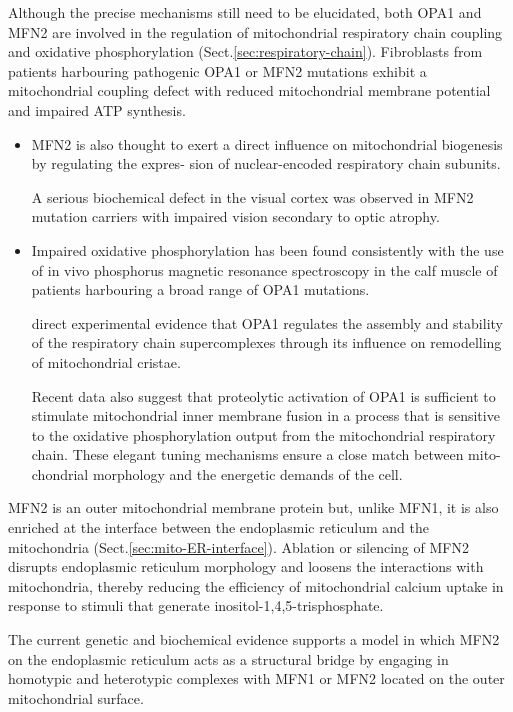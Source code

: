   
  Although the precise mechanisms still need to be elucidated, both OPA1 and
  MFN2 are involved in the regulation of mitochondrial respiratory chain
  coupling and oxidative phosphorylation (Sect.\ref{sec:respiratory-chain}).
  Fibroblasts from patients harbouring pathogenic OPA1 or MFN2 mutations exhibit
  a mitochondrial coupling defect with reduced mitochondrial membrane potential
  and impaired ATP synthesis.
  
  \begin{itemize}
  
    \item MFN2 is also thought to exert a direct influence on mitochondrial
    biogenesis by regulating the expres- sion of nuclear-encoded respiratory
    chain subunits.
    
    A serious biochemical defect in the visual cortex was observed in MFN2
    mutation carriers with impaired vision secondary to optic atrophy.
  
    \item Impaired oxidative phosphorylation has been found consistently with
    the use of in vivo phosphorus magnetic resonance spectroscopy in the calf
    muscle of patients harbouring a broad range of OPA1 mutations.
    
    
    direct experimental evidence that OPA1 regulates the assembly and
    stability of the respiratory chain supercomplexes through its influence on
    remodelling of mitochondrial cristae.
    
    Recent data also suggest that proteolytic activation of OPA1 is sufficient
    to stimulate mitochondrial inner membrane fusion in a process that is
    sensitive to the oxidative phosphorylation output from the mitochondrial
    respiratory chain.
    These elegant tuning mechanisms ensure a close match between mito- chondrial morphology and the energetic demands of the cell.
    
  \end{itemize}
  
  
  MFN2 is an outer mitochondrial membrane protein but, unlike MFN1, it is also
  enriched at the interface between the endoplasmic reticulum and the
  mitochondria (Sect.\ref{sec:mito-ER-interface}).
  Ablation or silencing of MFN2 disrupts endoplasmic reticulum morphology and
  loosens the interactions with mitochondria, thereby reducing the efficiency of
  mitochondrial calcium uptake in response to stimuli that generate
  inositol-1,4,5-trisphosphate.
  
  The current genetic and biochemical evidence supports a model in which MFN2 on
  the endoplasmic reticulum acts as a structural bridge by engaging in homotypic
  and heterotypic complexes with MFN1 or MFN2 located on the outer mitochondrial
  surface.
  

